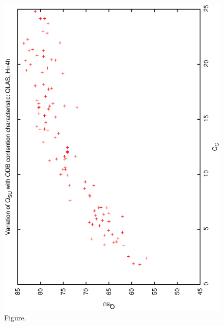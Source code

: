 \documentclass[12pt,a4paper]{article}
\begin{document}
\begin{figure}[htbp]
 \begin{center}
  \includegraphics[scale=1.0, angle=0]{figures/qsucc_ql4.eps}
 \end{center}
  \caption[Figure.]
{Figure.}
\end{figure}
\clearpage
\end{document}
